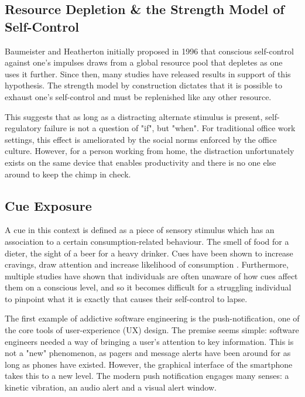 \subsection{Resource Depletion \& the Strength Model of Self-Control}
Baumeister and Heatherton \cite{baumeister1996self} initially proposed in 1996 that conscious self-control against one's impulses draws from a global resource pool that depletes as one uses it further. Since then, many studies have released results in support of this hypothesis. The strength model by construction dictates that it is possible to exhaust one's self-control and must be replenished like any other resource.

This suggests that as long as a distracting alternate stimulus is present, self-regulatory failure is not a question of "if", but "when". For traditional office work settings, this effect is ameliorated by the social norms enforced by the office culture. However, for a person working from home, the distraction unfortunately exists on the same device that enables productivity and there is no one else around to keep the chimp in check.

\subsection{Cue Exposure}
A cue in this context is defined as a piece of sensory stimulus which has an association to a certain consumption-related behaviour. The smell of food for a dieter, the sight of a beer for a heavy drinker. Cues have been shown to increase cravings, draw attention and increase likelihood of consumption \cite{jansen1998learning}. Furthermore, multiple studies have shown that individuals are often unaware of how cues affect them on a conscious level\cite{stacy2010implicit}, and so it becomes difficult for a struggling individual to pinpoint what it is exactly that causes their self-control to lapse.

The first example of addictive software engineering is the push-notification, one of the core tools of user-experience (UX) design. The premise seems simple: software engineers needed a way of bringing a user's attention to key information. This is not a "new" phenomenon, as pagers and message alerts have been around for as long as phones have existed. However, the graphical interface of the smartphone takes this to a new level. The modern push notification engages many senses: a kinetic vibration, an audio alert and a visual alert window.

